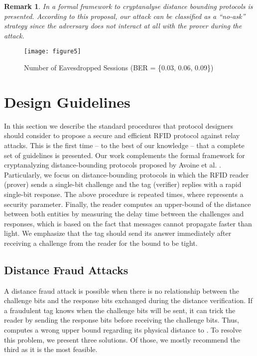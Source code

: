 \documentclass{article}
\newtheorem{remark}{Remark}
\begin{document}
\begin{remark}
In \cite{AvoineBKLM-2009-eprint} a formal framework to cryptanalyse distance bounding protocols is presented. According to this proposal, our attack can be classified as a ``no-ask'' strategy since the adversary does not interact at all with the prover during the attack.
\end{remark}

\begin{figure}
\centering
\texttt{[image: figure5]}\\
  \caption{Number of Eavesdropped Sessions (BER = \{0.03, 0.06, 0.09\})}\label{fig::fig6}
\end{figure}


\section{Design Guidelines}\label{sec::guidelines}

In this section we describe the standard procedures that protocol designers should consider to propose a secure and efficient RFID protocol against relay attacks. This is the first time -- to the best of our knowledge -- that a complete set of guidelines is presented. Our work complements the formal framework for cryptanalyzing distance-bounding protocols proposed by Avoine et al. \cite{AvoineBKLM-2009-eprint}.  Particularly, we focus on distance-bounding protocols in which the RFID reader (prover) sends a single-bit challenge and the tag (verifier) replies with a rapid single-bit response. The above procedure is repeated  times, where  represents a security parameter.  Finally, the reader computes an upper-bound of the distance between both entities by measuring the delay time between the challenges and responses, which is based on the fact that messages cannot propagate faster than light. We emphasize that the tag should send its answer immediately after receiving a challenge from the reader for the bound to be tight.

\subsection{Distance Fraud Attacks}\label{sec::dfsolution}
 A distance fraud attack is possible when there is no relationship between the challenge bits and the response bits exchanged during the distance verification.  If a fraudulent tag  knows when the challenge bits  will be sent,  it can trick the reader  by sending the response bits before receiving the challenge bits.  Thus,  computes a wrong upper bound regarding its physical distance to . To resolve this problem, we present three solutions. Of those, we mostly recommend the third as it is the most feasible.
\end{document}
